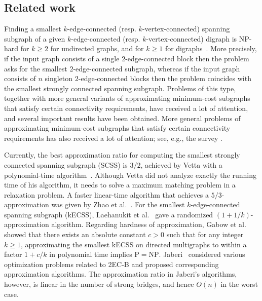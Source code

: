 \documentclass[11pt]{article}
\begin{document}
\subsection{Related work}
\label{sec:related-work}
Finding a smallest $k$-edge-connected (resp. $k$-vertex-connected) spanning subgraph of a given $k$-edge-connected (resp. $k$-vertex-connected) digraph is NP-hard for $k \ge 2$ for undirected graphs, and for $k \ge 1$ for digraphs~\cite{GJ:NP}.
More precisely, if the input graph consists of a single $2$-edge-connected block then the problem asks for the smallest $2$-edge-connected subgraph, whereas
if the input graph consists of $n$ singleton $2$-edge-connected blocks then the problem coincides with the smallest strongly connected spanning subgraph.
Problems of this type, together with more general variants of approximating minimum-cost subgraphs that satisfy certain connectivity requirements, have received a lot of attention, and several important results have been obtained. More general problems of approximating minimum-cost subgraphs that satisfy certain connectivity requirements has also received a lot of attention; see, e.g., the survey \cite{MCC:KZ:2007}.


Currently, the best approximation ratio for computing the smallest strongly connected spanning subgraph (\textsf{SCSS}) is $3/2$, achieved by Vetta with a polynomial-time algorithm~\cite{Vetta:MSCS:2001}. 
Although Vetta did not analyze exactly the running time of his algorithm, it needs to solve a maximum matching problem in a relaxation problem. 
A faster linear-time algorithm that achieves a $5/3$-approximation was given by Zhao et al.~\cite{ZNI:MSCS:2003}.
For the smallest $k$-edge-connected spanning subgraph (\textsf{kECSS}), Laehanukit et al.~\cite{LGS:MSCS:2012} gave a randomized $(1+1/k)$-approximation algorithm.
Regarding hardness of approximation, Gabow et al. \cite{GGTW:kECSS:2009} showed that there exists an
absolute constant $c>0$ such that for any integer $k \ge 1$, approximating the smallest \textsf{kECSS} on directed multigraphs to
within a factor $1 + c/k$ in polynomial time implies $\mathrm{P} = \mathrm{NP}$. Jaberi~\cite{2vcb:jaberi} considered various optimization problems related to \textsf{2EC-B} and proposed corresponding approximation algorithms. The approximation ratio in Jaberi's algorithms, however, is linear in the number of strong bridges, and hence $O(n)$ in the worst case.
\end{document}
